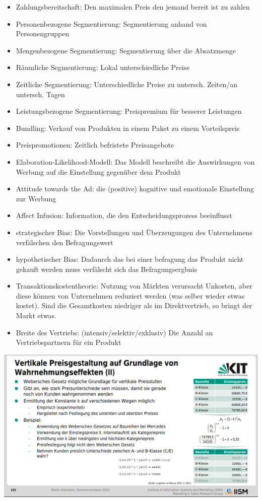 \documentclass[]{article}
\begin{document}
\begin{itemize}
    \item Zahlungsbereitschaft: Den maximalen Preis den jemand bereit ist zu zahlen
    \item Personenbezogene Segmentierung: Segmentierung anhand von Personengruppen
    \item Mengenbezogene Segmentierung: Segmentierung über die Absatzmenge
    \item Räumliche Segmentierung: Lokal unterschiedliche Preise
    \item Zeitliche Segmentierung: Unterschiedliche Preise zu untersch. Zeiten/an untersch. Tagen
    \item Leistungsbezogene Segmentierung: Preispremium für besserer Leistungen
    \item Bundling: Verkauf von Produkten in einem Paket zu einem Vorteilspreis
    \item Preispromotionen: Zeitlich befristete Preisangebote
    \item Elaboration-Likelihood-Modell: Das Modell beschreibt die Auswirkungen von Werbung auf die Einstellung gegenüber dem Produkt
    \item Attitude towards the Ad: die (positive) kognitive und emotionale Einstellung zur Werbung
    \item Affect Infusion: Information, die den Entscheidungsprozess beeinflusst
    \item strategischer Bias: Die Vorstellungen und Überzeugungen des Unternehmens verfälschen den Befragungswert
    \item hypothetischer Bias: Dadaurch das bei einer befragung das Produkt nicht gekauft werden muss verfälscht sich das Befragungsergbnis
    \item Transaktionskostentheorie: Nutzung von Märkten verursacht Unkosten, aber diese können von Unternehmen reduziert werden (was selber wieder etwas kostet). Sind die Gesamtkosten niedriger als im Direktvertrieb, so bringt der Markt etwas.
    \item Breite des Vertriebs: (intensiv/selektiv/exklusiv) Die Anzahl an Vertriebspartnern für ein Produkt
\end{itemize}

\includegraphics[width=\textwidth]{bilder/vertikale-preisgestaltung.png}
\end{document}
